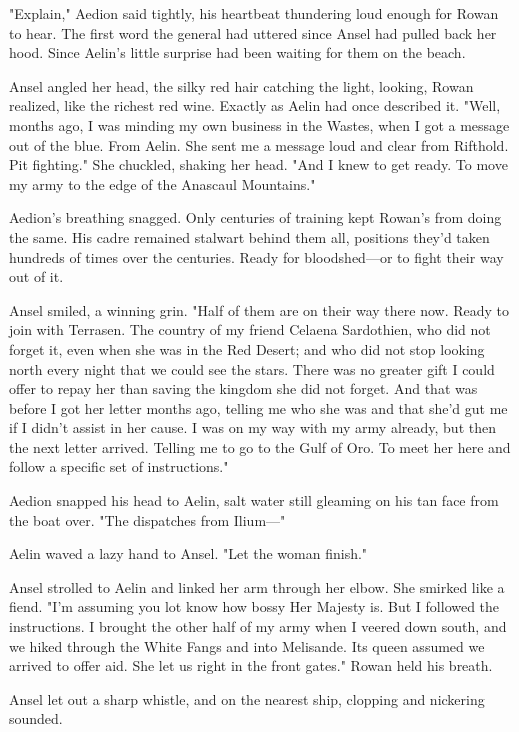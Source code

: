 "Explain," Aedion said tightly, his heartbeat thundering loud enough for Rowan to hear.
The first word the general had uttered since Ansel had pulled back her hood.
Since Aelin's little surprise had been waiting for them on the beach.

Ansel angled her head, the silky red hair catching the light, looking, Rowan realized, like the richest red wine.
Exactly as Aelin had once described it.
"Well, months ago, I was minding my own business in the Wastes, when I got a message out of the blue.
From Aelin.
She sent me a message loud and clear from Rifthold.
Pit fighting."
She chuckled, shaking her head.
"And I knew to get ready.
To move my army to the edge of the Anascaul Mountains."

Aedion's breathing snagged.
Only centuries of training kept Rowan's from doing the same.
His cadre remained stalwart behind them all, positions they'd taken hundreds of times over the centuries.
Ready for bloodshed---or to fight their way out of it.

Ansel smiled, a winning grin.
"Half of them are on their way there now.
Ready to join with Terrasen.
The country of my friend Celaena Sardothien, who did not forget it, even when she was in the Red Desert;
and who did not stop looking north every night that we could see the stars.
There was no greater gift I could offer to repay her than saving the kingdom she did not forget.
And that was before I got her letter months ago, telling me who she was and that she'd gut me if I didn't assist in her cause.
I was on my way with my army already, but 
then the next letter arrived.
Telling me to go to the Gulf of Oro.
To meet her here and follow a specific set of instructions."

Aedion snapped his head to Aelin, salt water still gleaming on his tan face from the boat over.
"The dispatches from Ilium---"

Aelin waved a lazy hand to Ansel.
"Let the woman finish."

Ansel strolled to Aelin and linked her arm through her elbow.
She smirked like a fiend.
"I'm assuming you lot know how bossy Her Majesty is.
But I followed the instructions.
I brought the other half of my army when I veered down south, and we hiked through the White Fangs and into Melisande.
Its queen assumed we arrived to offer aid.
She let us right in the front gates."
Rowan held his breath.

Ansel let out a sharp whistle, and on the nearest ship, clopping and nickering sounded.

